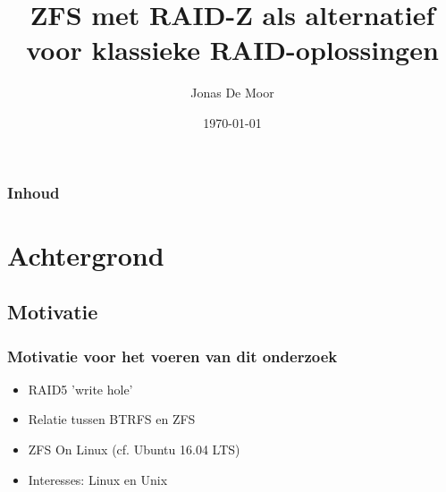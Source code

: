 \documentclass{beamer}
\title[Presentatie Bachelorproef]{ZFS met RAID-Z als alternatief voor klassieke RAID-oplossingen} %
\author{Jonas De Moor} %
\institute[HoGent] %
{
Toegepaste Informatica - Systeem- en Netwerkbeheer \\ Hogeschool Gent \\ %
\medskip
\textit{jonas.demoor.v3741@student.hogent.be} %
}
\date{\today} %
\begin{document}
\begin{frame}
\titlepage %
\end{frame}

\begin{frame}
\frametitle{Inhoud} %
\tableofcontents %
\end{frame}


\section{Achtergrond} %

\subsection{Motivatie} %


\begin{frame}
\frametitle{Motivatie voor het voeren van dit onderzoek}

  \begin{itemize}
    \item{RAID5 'write hole'}
    \item Relatie tussen BTRFS en ZFS
    \item ZFS On Linux (cf. Ubuntu 16.04 LTS)
    \item Interesses: Linux en Unix
  \end{itemize}

\end{frame}
\end{document}

